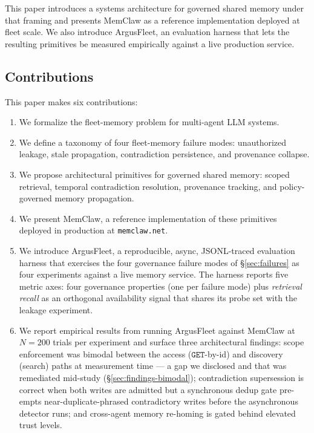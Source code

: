 \documentclass[10pt,twocolumn,letterpaper]{article}
\begin{document}
This paper introduces a systems architecture for governed shared memory under that framing and presents MemClaw as a reference implementation deployed at fleet scale. We also introduce ArgusFleet, an evaluation harness that lets the resulting primitives be measured empirically against a live production service.

\subsection{Contributions}

This paper makes six contributions:
\begin{enumerate}
    \item We formalize the fleet-memory problem for multi-agent LLM systems.
    \item We define a taxonomy of four fleet-memory failure modes: unauthorized leakage, stale propagation, contradiction persistence, and provenance collapse.
    \item We propose architectural primitives for governed shared memory: scoped retrieval, temporal contradiction resolution, provenance tracking, and policy-governed memory propagation.
    \item We present MemClaw, a reference implementation of these primitives deployed in production at \texttt{memclaw.net}.
    \item We introduce ArgusFleet, a reproducible, async, JSONL-traced evaluation harness that exercises the four governance failure modes of \S\ref{sec:failures} as four experiments against a live memory service. The harness reports five metric axes: four governance properties (one per failure mode) plus \emph{retrieval recall} as an orthogonal availability signal that shares its probe set with the leakage experiment.
    \item We report empirical results from running ArgusFleet against MemClaw at \(N=200\) trials per experiment and surface three architectural findings: scope enforcement was bimodal between the access (\(\mathtt{GET}\)-by-id) and discovery (search) paths at measurement time --- a gap we disclosed and that was remediated mid-study (\S\ref{sec:findings-bimodal}); contradiction supersession is correct when both writes are admitted but a synchronous dedup gate pre-empts near-duplicate-phrased contradictory writes before the asynchronous detector runs; and cross-agent memory re-homing is gated behind elevated trust levels.
\end{enumerate}
\end{document}
